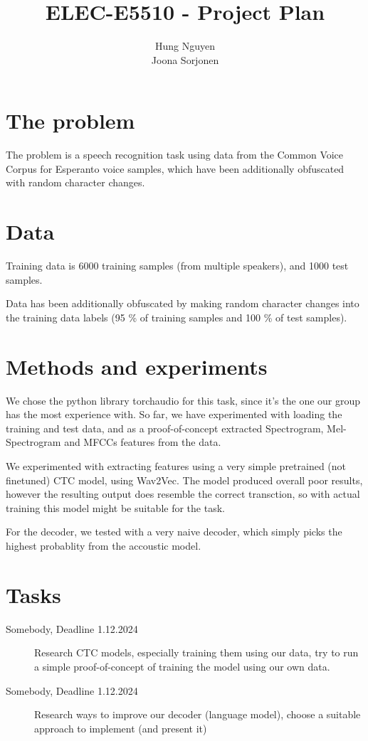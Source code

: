 \documentclass[12pt, english]{article}
\begin{document}
\title{ELEC-E5510 - Project Plan}
\author{
    Hung Nguyen \\
    Joona Sorjonen \\
}
\date{
}

\maketitle

\tableofcontents
\clearpage


\section{The problem}
The problem is a speech recognition task using data from the Common Voice Corpus for Esperanto voice samples, which have been additionally obfuscated with random character changes.


\section{Data}
Training data is 6000 training samples (from multiple speakers), and 1000 test samples.

Data has been additionally obfuscated by making random character changes into the training data labels (95 \% of training samples and 100 \% of test samples).


\section{Methods and experiments}

We chose the python library torchaudio for this task, since it's the one our group has the most experience with. So far, we have experimented with loading the training and test data, and as a proof-of-concept extracted Spectrogram, Mel-Spectrogram and MFCCs features from the data.

We experimented with extracting features using a very simple pretrained (not finetuned) CTC model, using Wav2Vec. The model produced overall poor results, however the resulting output does resemble the correct transction, so with actual training this model might be suitable for the task.

For the decoder, we tested with a very naive decoder, which simply picks the highest probablity from the accoustic model.


\section{Tasks}

\begin{description}
    \item[Somebody, Deadline 1.12.2024] Research CTC models, especially training them using our data, try to run a simple proof-of-concept of training the model using our own data.
    \item[Somebody, Deadline 1.12.2024] Research ways to improve our decoder (language model), choose a suitable approach to implement (and present it)
\end{description}
\end{document}
